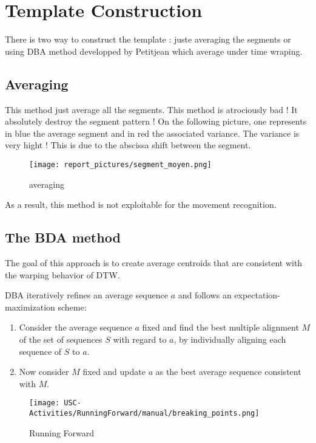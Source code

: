 \documentclass[a4,12pt]{article}
\begin{document}
	\section{Template Construction}
	
	There is two way to construct the template : juste averaging the segments or using DBA method developped by Petitjean\cite{petitjean} which average under time wraping. 
	
	\subsection{Averaging}
		
		This method just average all the segments. This method is atrociously bad ! It absolutely destroy the segment pattern ! On the following picture, one represents in blue the average segment and in red the associated variance. The variance is very hight ! This is due to the abscissa shift between the segment.
		
	\begin{figure}[H]
		\centering
		\texttt{[image: report\_pictures/segment\_moyen.png]}
		\caption{averaging}
		\label{Just averaging}
	\end{figure}
	
		As a result, this method is not exploitable for the movement recognition.
		
	\subsection{The BDA method}
		
	The goal of this approach is to create average centroids that are consistent with the warping behavior of DTW. 
	
	DBA iteratively refines an average sequence $a$ and follows an expectation-maximization scheme:
	\begin{enumerate}
		\item Consider the average sequence $a$ fixed and find the best multiple alignment $M$ of the set of sequences $S$ with regard to $a$, by individually aligning each sequence of $S$ to $a$.
		\item Now consider $M$ fixed and update $a$ as the best average sequence consistent with $M$.
	\end{enumerate}

	\begin{figure}[H]
		\centering
		\texttt{[image: USC-Activities/RunningForward/manual/breaking\_points.png]}
		\caption{Running Forward}
		\label{RunningForward}
	\end{figure}
	
\end{document}
